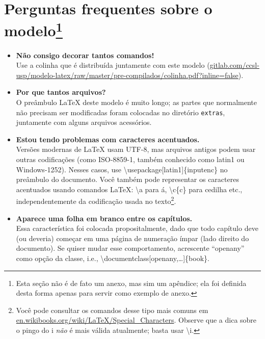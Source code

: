 
\chapter[Perguntas frequentes sobre o modelo]{Perguntas frequentes sobre o modelo\footnote{Esta
seção não é de fato um anexo, mas sim um apêndice; ela foi definida desta
forma apenas para servir como exemplo de anexo.}}

\begin{itemize}

\item \textbf{Não consigo decorar tantos comandos!}\\
Use a colinha que é distribuída juntamente com este modelo (\url{gitlab.com/ccsl-usp/modelo-latex/raw/master/pre-compilados/colinha.pdf?inline=false}).

\item \textbf{Por que tantos arquivos?}\\
O preâmbulo \LaTeX{} deste modelo é muito longo; as partes que normalmente não precisam ser modificadas foram colocadas no diretório \texttt{extras}, juntamente com alguns arquivos acessórios.

\item \textbf{Estou tendo problemas com caracteres acentuados.}\\
Versões modernas de \LaTeX{} usam UTF-8, mas arquivos antigos podem usar outras codificações (como ISO-8859-1, também conhecido como latin1 ou Windows-1252). Nesses casos, use \textsf{\textbackslash{}usepackage[latin1]\{inputenc\}} no preâmbulo do documento. Você também pode representar os caracteres acentuados usando comandos \LaTeX{}: \textsf{\textbackslash\textquotesingle{}a} para á, \textsf{\textbackslash{}c\{c\}} para cedilha etc., independentemente da codificação usada no texto\footnote{Você pode consultar os comandos desse tipo mais comuns em \url{en.wikibooks.org/wiki/LaTeX/Special_Characters}. Observe que a dica sobre o pingo do i \emph{não} é mais válida atualmente; basta usar \textsf{\textbackslash\textquotesingle{}i}.}.

\item \textbf{Aparece uma folha em branco entre os capítulos.}\\
Essa característica foi colocada propositalmente, dado que todo capítulo deve (ou deveria) começar em uma página de numeração ímpar (lado direito do documento). Se quiser mudar esse comportamento, acrescente ``openany'' como opção da classe, i.e., \textsf{\textbackslash{}documentclass[openany,\dots]\{book\}}.


\end{itemize}
